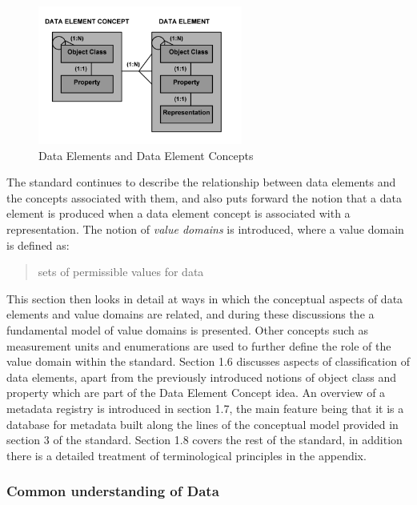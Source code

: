 \documentclass{llncs}
\begin{document}
\begin{figure}[h]
\includegraphics[width=0.6\textwidth,natwidth=610,natheight=642]{DataElementConcept}
\caption{Data Elements and Data Element Concepts} 
\label{fig:DEC}
\end{figure}

The standard continues to describe the relationship between data elements and the concepts associated with them, and also puts forward the notion that a data element is produced when a data element concept is associated with a representation. The notion of \emph{value domains} is introduced, where a value domain is defined as:

\begin{quotation} {sets of permissible values for data} \end{quotation}

This section then looks in detail at ways in which the conceptual aspects of data elements and value domains are related, and during these discussions the a fundamental model of value domains is presented. Other concepts such as measurement units and enumerations are used to further define the role of the value domain within the standard. Section 1.6 discusses aspects of classification of data elements, apart from the previously introduced notions of object class and property which are part of the Data Element Concept idea. An overview of a metadata registry is introduced in section 1.7, the main feature being that it is a database for metadata built along the lines of the conceptual model provided in section 3 of the standard. Section 1.8 covers the rest of the standard, in addition there is a detailed treatment of terminological principles in the appendix.


\subsubsection{Common understanding of Data}
\end{document}
